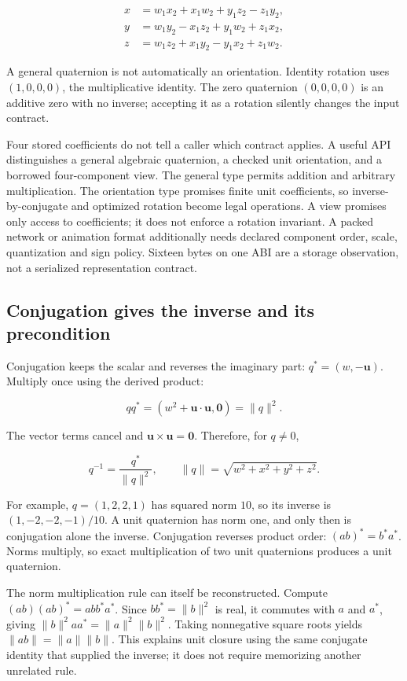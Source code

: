 \[
\begin{aligned}
x&=w_1x_2+x_1w_2+y_1z_2-z_1y_2,\\
y&=w_1y_2-x_1z_2+y_1w_2+z_1x_2,\\
z&=w_1z_2+x_1y_2-y_1x_2+z_1w_2.
\end{aligned}
\]

A general quaternion is not automatically an orientation. Identity rotation uses \((1,0,0,0)\), the multiplicative identity. The zero quaternion \((0,0,0,0)\) is an additive zero with no inverse; accepting it as a rotation silently changes the input contract.

Four stored coefficients do not tell a caller which contract applies. A useful API distinguishes a general algebraic quaternion, a checked unit orientation, and a borrowed four-component view. The general type permits addition and arbitrary multiplication. The orientation type promises finite unit coefficients, so inverse-by-conjugate and optimized rotation become legal operations. A view promises only access to coefficients; it does not enforce a rotation invariant. A packed network or animation format additionally needs declared component order, scale, quantization and sign policy. Sixteen bytes on one ABI are a storage observation, not a serialized representation contract.

\subsection{Conjugation gives the inverse and its precondition}\label{01-foundations-i-ch019-conjugation-gives-the-inverse-and-its-precondition}

Conjugation keeps the scalar and reverses the imaginary part: \(q^*=(w,-\mathbf u)\). Multiply once using the derived product:

\[
qq^*=(w^2+\mathbf u\cdot\mathbf u,\mathbf0)
=\|q\|^2.
\]

The vector terms cancel and \(\mathbf u\times\mathbf u=\mathbf0\). Therefore, for \(q\ne0\),

\[
q^{-1}=\frac{q^*}{\|q\|^2},
\qquad
\|q\|=\sqrt{w^2+x^2+y^2+z^2}.
\]

For example, \(q=(1,2,2,1)\) has squared norm \(10\), so its inverse is \((1,-2,-2,-1)/10\). A unit quaternion has norm one, and only then is conjugation alone the inverse. Conjugation reverses product order: \((ab)^*=b^*a^*\). Norms multiply, so exact multiplication of two unit quaternions produces a unit quaternion.

The norm multiplication rule can itself be reconstructed. Compute \((ab)(ab)^*=abb^*a^*\). Since \(bb^*=\|b\|^2\) is real, it commutes with \(a\) and \(a^*\), giving \(\|b\|^2aa^*=\|a\|^2\|b\|^2\). Taking nonnegative square roots yields \(\|ab\|=\|a\|\|b\|\). This explains unit closure using the same conjugate identity that supplied the inverse; it does not require memorizing another unrelated rule.

